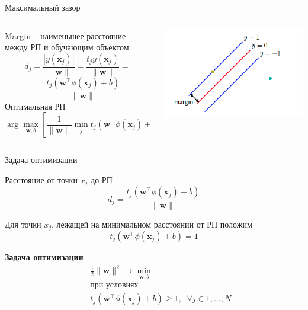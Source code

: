 \documentclass[10pt]{beamer}
\begin{document}
\begin{frame}{Максимальный зазор}

\begin{columns}[T]
    \begin{column}{.51\textwidth}
    Margin -- наименьшее расстояние между РП и обучающим объектом.
    \[
    d_j = \frac{|y(\mathbf{x}_j)|}{\|\mathbf{w}\|} = \frac{t_j y(\mathbf{x}_j)}{\|\mathbf{w}\|} = 
    \]    
    \[
    = \frac{t_j (\mathbf{w}^\top \phi(\mathbf{x}_j) + b)}{\|\mathbf{w}\|}
    \]
    Оптимальная РП
    \[
    \arg \max_{\mathbf{w}, b} \left[\frac{1}{\|\mathbf{w}\|} \min_j t_j (\mathbf{w}^\top \phi(\mathbf{x}_j) + b) \right]
    \]
	
    \end{column}
       
    \begin{column}{.5\textwidth}
    \vspace{-0em}
	\begin{center}
   		\includegraphics[scale=0.45]{images/margin.png}
    \end{center}
    \end{column}
  \end{columns}
  
\end{frame}

\begin{frame}{Задача оптимизации}

Расстояние от точки $x_j$ до РП
\[
d_j = \frac{t_j (\mathbf{w}^\top \phi(\mathbf{x}_j) + b)}{\|\mathbf{w}\|}
\]

Для точки $x_j$, лежащей на минимальном расстоянии от РП положим
\[
t_j (\mathbf{w}^\top \phi(\mathbf{x}_j) + b) = 1
\]

\begin{framed}
{\bf Задача оптимизации}
\begin{eqnarray*}
&& \frac 1 2 \|\mathbf{w}\|^2 \rightarrow \min_{\mathbf{w}, b} \\
&& \text{при условиях} \\
&& t_j (\mathbf{w}^\top \phi(\mathbf{x}_j) + b) \geq 1, \;\; \forall j \in 1,\ldots,N
\end{eqnarray*}
\end{framed}

\end{frame}
\end{document}
